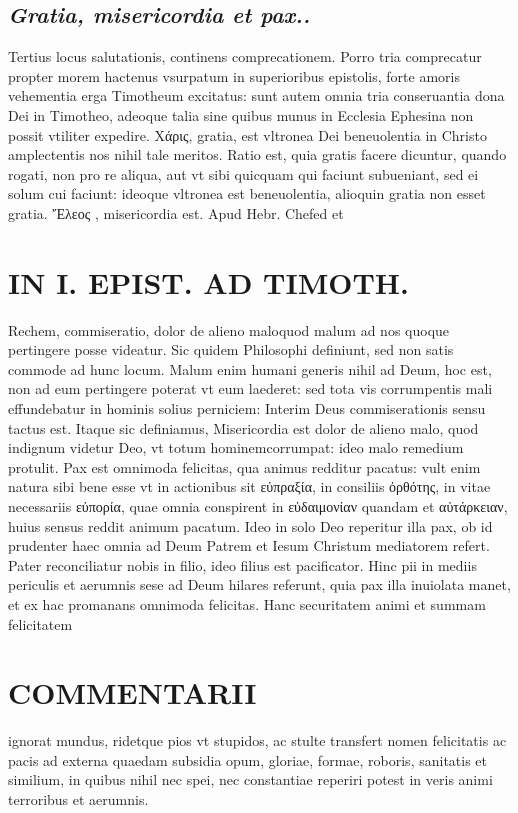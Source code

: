 \documentclass{article}
\begin{document}
\begin{pages}
\subsection*{\textit{Gratia, misericordia et pax.. }}\pstart Tertius locus salutationis, continens comprecationem. Porro tria comprecatur propter morem hactenus vsurpatum in superioribus epistolis, forte amoris vehementia erga Timotheum excitatus: sunt autem omnia tria conseruantia dona Dei in Timotheo, adeoque talia sine quibus munus in Ecclesia Ephesina non possit vtiliter expedire.  \pend\pstart Xάρις, gratia, est vltronea Dei beneuolentia in Christo amplectentis nos nihil tale meritos. Ratio est, quia gratis facere dicuntur, quando rogati, non pro re aliqua, aut vt sibi quicquam qui faciunt subueniant, sed ei solum cui faciunt: ideoque vltronea est beneuolentia, alioquin gratia non esset gratia. Ἔλεος , misericordia est. Apud Hebr. Chefed et  \pend
\section*{IN I. EPIST. AD TIMOTH. }
\marginpar{[ p.15 ]}\pstart Rechem, commiseratio, dolor de alieno maloquod malum ad nos quoque pertingere posse videatur. Sic quidem Philosophi definiunt, sed non satis commode ad hunc locum. Malum enim humani generis nihil ad Deum, hoc est, non ad eum pertingere poterat vt eum laederet: sed tota vis corrumpentis mali effundebatur in hominis solius perniciem: Interim Deus commiserationis sensu tactus est. Itaque sic definiamus, Misericordia est dolor de alieno malo, quod indignum videtur Deo, vt totum hominemcorrumpat: ideo malo remedium protulit.  \pend\pstart Pax est omnimoda felicitas, qua animus redditur pacatus: vult enim natura sibi bene esse vt in actionibus sit εὐπραξία, in consiliis ὀρθότης, in vitae necessariis εὐπορία, quae omnia conspirent in εὐδαιμονίαν quandam et αὐτάρκειαν, huius sensus reddit animum pacatum. Ideo in solo Deo reperitur illa pax, ob id prudenter haec omnia ad Deum Patrem et Iesum Christum mediatorem refert. Pater reconciliatur nobis in filio, ideo filius est pacificator. Hinc pii in mediis periculis et aerumnis sese ad Deum hilares referunt, quia pax illa inuiolata manet, et ex hac promanans omnimoda felicitas.  \pend\pstart Hanc securitatem animi et summam felicitatem  \pend
\section*{COMMENTARII }
\marginpar{[ p.16 ]}\pstart ignorat mundus, ridetque pios vt stupidos, ac stulte transfert nomen felicitatis ac pacis ad externa quaedam subsidia opum, gloriae, formae, roboris, sanitatis et similium, in quibus nihil nec spei, nec constantiae reperiri potest in veris animi terroribus et aerumnis.  \pend
{}
{}

\end{pages}
\end{document}
